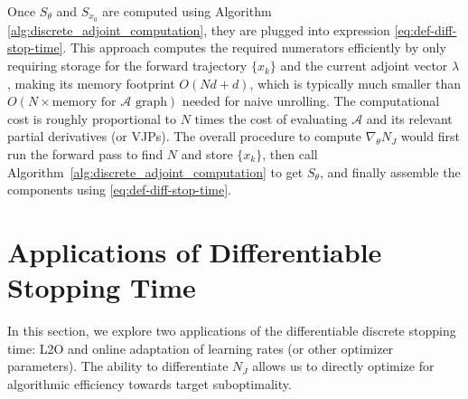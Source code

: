 \documentclass{article}
\newcommand{\Acal}{\mathcal{A}}
\begin{document}
Once $S_{\theta}$ and $S_{x_0}$ are computed using Algorithm \ref{alg:discrete_adjoint_computation}, they are plugged into expression \eqref{eq:def-diff-stop-time}. This approach computes the required numerators efficiently by only requiring storage for the forward trajectory $\{x_k\}$ and the current adjoint vector $\lambda$, making its memory footprint $O(Nd + d)$, which is typically much smaller than $O(N \times \text{memory for } \Acal \text{ graph})$ needed for naive unrolling. The computational cost is roughly proportional to $N$ times the cost of evaluating $\Acal$ and its relevant partial derivatives (or VJPs).
The overall procedure to compute $\nabla_{\theta} N_J$ would first run the forward pass to find $N$ and store $\{x_k\}$, then call Algorithm~\ref{alg:discrete_adjoint_computation} to get $S_{\theta}$, and finally assemble the components using \eqref{eq:def-diff-stop-time}.

\section{Applications of Differentiable Stopping Time}
\label{sec:applications}
In this section, we explore two applications of the differentiable discrete stopping time: L2O and online adaptation of learning rates (or other optimizer parameters). The ability to differentiate $N_J$ allows us to directly optimize for algorithmic efficiency towards target suboptimality.
\end{document}
